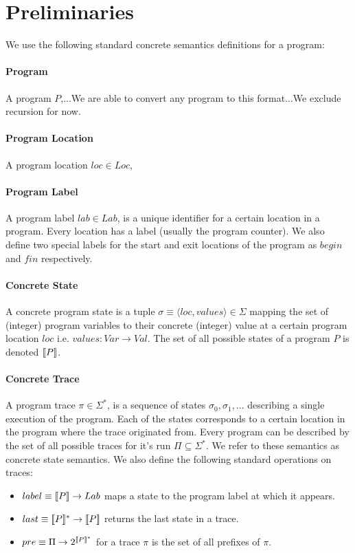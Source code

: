 \section{Preliminaries} 
We use the following standard concrete semantics definitions for a program:

\paragraph{Program}  A program $P$,...We are able to convert any program to this format...We exclude recursion for now.

\paragraph{Program Location} 
A program location $loc \in Loc$,

\paragraph{Program Label} 
A program label $lab \in Lab$, is a unique identifier for a certain location in a program. Every location has a label (usually the program counter). We also define two special labels for the start and exit locations of the program as $begin$ and $fin$ respectively.

\paragraph{Concrete State} 
A concrete program state is a tuple $\sigma \equiv \langle loc, values \rangle \in \Sigma$ mapping the set of (integer) program variables to their concrete (integer) value at a certain program location $loc$ i.e. $values : Var \rightarrow Val$. The set of all possible states of a program $P$ is denoted $\lbrack\!\lbrack P \rbrack\!\rbrack$.

\paragraph{Concrete Trace} 
A program trace $\pi \in \Sigma^*$, is a sequence of states $\sigma_0,\sigma_1,...$ describing a single execution of the program. Each of the states corresponds to a certain location in the program where the trace originated from. Every program can be described by the set of all possible traces for it's run $\Pi \subseteq \Sigma^*$. We refer to these semantics as concrete state semantics. We also define the following standard operations on traces:
\begin{itemize}
\item $label \equiv \lbrack\!\lbrack P \rbrack\!\rbrack \rightarrow Lab$ maps a state to the program label at which it appears.
\item $last \equiv \lbrack\!\lbrack P \rbrack\!\rbrack^* \rightarrow \lbrack\!\lbrack P \rbrack\!\rbrack$ returns the last state in a trace.
\item $pre \equiv \Pi \rightarrow 2^{\lbrack\!\lbrack P \rbrack\!\rbrack^*}$ for a trace $\pi$ is the set of all prefixes of $\pi$.
\end{itemize}

